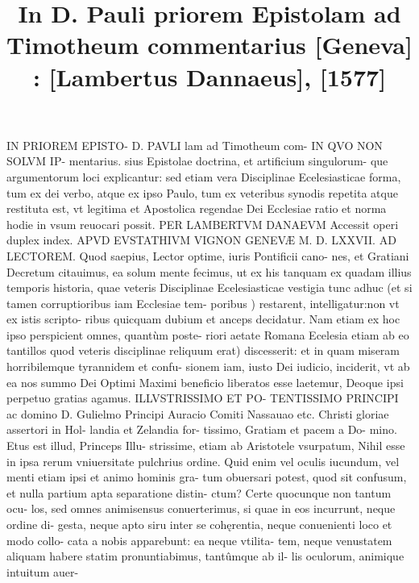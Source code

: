 \documentclass{article}
\begin{document}
\date{}
        \title{In D. Pauli priorem Epistolam ad Timotheum commentarius [Geneva] : [Lambertus Dannaeus], [1577]}
\maketitle

\begin{pages} 
\beginnumbering
        IN PRIOREM EPISTO- D.  PAVLI lam ad Timotheum com- IN QVO NON SOLVM IP- mentarius. sius Epistolae doctrina, et artificium singulorum- que argumentorum loci explicantur: sed etiam vera Disciplinae Ecelesiasticae forma, tum ex dei verbo, atque ex ipso Paulo, tum ex veteribus synodis repetita atque restituta est, vt legitima et Apostolica regendae Dei Ecclesiae ratio et norma hodie in vsum reuocari possit. PER LAMBERTVM DANAEVM Accessit operi duplex index. APVD EVSTATHIVM VIGNON GENEVÆ M. D. LXXVII. 
        AD LECTOREM. Quod saepius, Lector optime, iuris Pontificii cano- nes, et Gratiani Decretum citauimus, ea solum mente fecimus, ut ex his tanquam ex quadam illius temporis historia, quae veteris Disciplinae Ecelesiasticae vestigia tunc adhuc (et si tamen corruptioribus iam Ecclesiae tem- poribus ) restarent, intelligatur:non vt ex istis scripto- ribus quicquam dubium et anceps decidatur. Nam etiam ex hoc ipso perspicient omnes, quantùm poste- riori aetate Romana Ecelesia etiam ab eo tantillos quod veteris disciplinae reliquum erat) discesserit: et in quam miseram horribilemque tyrannidem et confu- sionem iam, iusto Dei iudicio, inciderit, vt ab ea nos summo Dei Optimi Maximi beneficio liberatos esse laetemur, Deoque ipsi perpetuo gratias agamus. ILLVSTRISSIMO ET PO- TENTISSIMO PRINCIPI ac domino D. Gulielmo Principi Auracio Comiti Nassauao etc.  Christi gloriae assertori in Hol- landia et Zelandia for- tissimo, Gratiam et pacem a Do- mino. Etus est illud, Princeps Illu- strissime, etiam ab Aristotele vsurpatum, Nihil esse in ipsa rerum vniuersitate pulchrius ordine. Quid enim vel oculis iucundum, vel menti etiam ipsi et animo hominis gra- tum obuersari potest, quod sit confusum, et nulla partium apta separatione distin- ctum? Certe quocunque non tantum ocu- los, sed omnes animisensus conuerterimus, si quae in eos incurrunt, neque ordine di- gesta, neque apto siru inter se cohęrentia, neque conuenienti loco et modo collo- cata a nobis apparebunt: ea neque vtilita- tem, neque venustatem aliquam habere statim pronuntiabimus, tantûmque ab il- lis oculorum, animique intuitum auer- 
\textbf{}

\end{pages}
\end{document}
